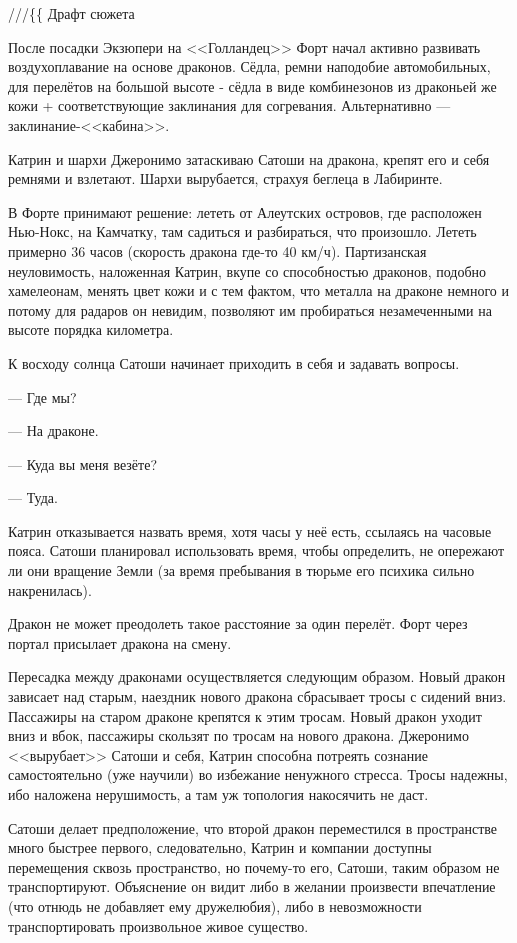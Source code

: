///\{\{ Драфт сюжета


После посадки Экзюпери на <<Голландец>> Форт начал активно развивать воздухоплавание на основе драконов.
Сёдла, ремни наподобие автомобильных, для перелётов на большой высоте - сёдла в виде комбинезонов из драконьей же кожи
+ соответствующие заклинания для согревания. Альтернативно --- заклинание-<<кабина>>.

Катрин и шархи Джеронимо затаскиваю Сатоши на дракона, крепят его и себя ремнями и взлетают.
Шархи вырубается, страхуя беглеца в Лабиринте.

В Форте принимают решение: лететь от Алеутских островов, где расположен Нью-Нокс, на Камчатку,
там садиться и разбираться, что произошло. Лететь примерно 36 часов (скорость дракона где-то 40 км/ч).
Партизанская неуловимость, наложенная Катрин, вкупе со способностью драконов, подобно хамелеонам,
менять цвет кожи и с тем фактом, что металла на драконе немного и потому для радаров он невидим,
позволяют им пробираться незамеченными на высоте порядка километра.

К восходу солнца Сатоши начинает приходить в себя и задавать вопросы.

--- Где мы?

--- На драконе.

--- Куда вы меня везёте?

--- Туда.

Катрин отказывается назвать время, хотя часы у неё есть, ссылаясь на часовые пояса.
Сатоши планировал использовать время, чтобы определить, не опережают ли они вращение Земли
(за время пребывания в тюрьме его психика сильно накренилась).

Дракон не может преодолеть такое расстояние за один перелёт. Форт через портал присылает дракона на смену.

Пересадка между драконами осуществляется следующим образом.
Новый дракон зависает над старым, наездник нового дракона сбрасывает тросы с сидений вниз.
Пассажиры на старом драконе крепятся к этим тросам.
Новый дракон уходит вниз и вбок, пассажиры скользят по тросам на нового дракона.
Джеронимо <<вырубает>> Сатоши и себя, Катрин способна потреять сознание самостоятельно (уже научили) во избежание ненужного стресса.
Тросы надежны, ибо наложена нерушимость, а там уж топология накосячить не даст.

Сатоши делает предположение, что второй дракон переместился в пространстве много быстрее первого,
следовательно, Катрин и компании доступны перемещения сквозь пространство, но почему-то его,
Сатоши, таким образом не транспортируют. Объяснение он видит либо в желании произвести впечатление
(что отнюдь не добавляет ему дружелюбия), либо в невозможности транспортировать произвольное живое существо.

